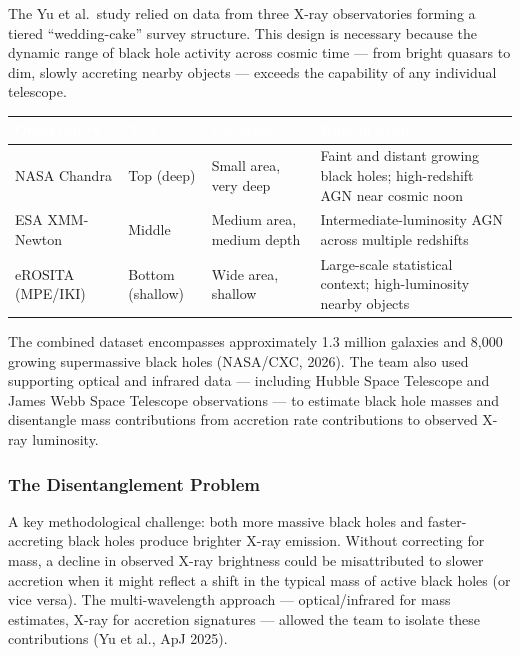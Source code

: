 \documentclass[11pt,letterpaper]{article}
\newcommand{\tableheader}[1]{\textbf{\sffamily\textcolor{white}{#1}}}
\begin{document}
The Yu et al.\ study relied on data from three X-ray observatories forming a tiered ``wedding-cake'' survey structure. This design is necessary because the dynamic range of black hole activity across cosmic time --- from bright quasars to dim, slowly accreting nearby objects --- exceeds the capability of any individual telescope.

\begin{center}
\begin{tabularx}{\textwidth}{L{3cm}L{3.5cm}L{3.5cm}X}
\toprule
{}
\tableheader{Observatory} & \tableheader{Tier} & \tableheader{Coverage} & \tableheader{Role in Study} \\
\midrule
NASA Chandra & Top (deep) & Small area, very deep & Faint and distant growing black holes; high-redshift AGN near cosmic noon \\
ESA XMM-Newton & Middle & Medium area, medium depth & Intermediate-luminosity AGN across multiple redshifts \\
eROSITA (MPE/IKI) & Bottom (shallow) & Wide area, shallow & Large-scale statistical context; high-luminosity nearby objects \\
\bottomrule
\end{tabularx}
\end{center}

The combined dataset encompasses approximately 1.3 million galaxies and 8,000 growing supermassive black holes (NASA/CXC, 2026). The team also used supporting optical and infrared data --- including Hubble Space Telescope and James Webb Space Telescope observations --- to estimate black hole masses and disentangle mass contributions from accretion rate contributions to observed X-ray luminosity.

\subsubsection{The Disentanglement Problem}

A key methodological challenge: both more massive black holes and faster-accreting black holes produce brighter X-ray emission. Without correcting for mass, a decline in observed X-ray brightness could be misattributed to slower accretion when it might reflect a shift in the typical mass of active black holes (or vice versa). The multi-wavelength approach --- optical/infrared for mass estimates, X-ray for accretion signatures --- allowed the team to isolate these contributions (Yu et al., ApJ 2025).
\end{document}
